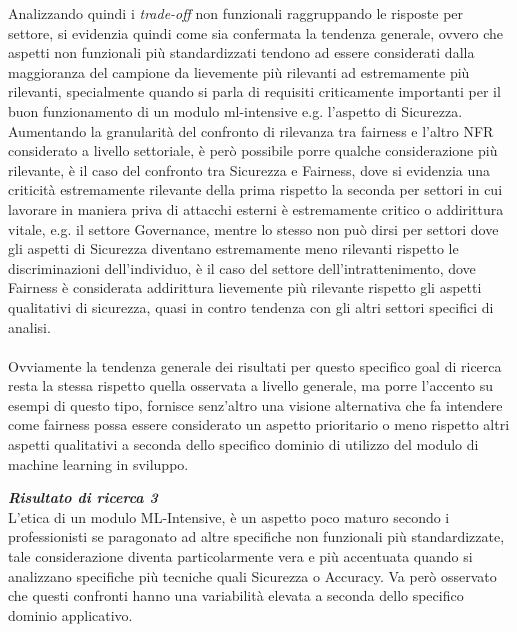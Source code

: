     Analizzando quindi i \emph{trade-off} non funzionali raggruppando le risposte per settore, si evidenzia quindi come sia confermata la tendenza generale, ovvero che aspetti non funzionali più standardizzati tendono ad essere considerati dalla maggioranza del campione da lievemente più rilevanti ad estremamente più rilevanti, specialmente quando si parla di requisiti criticamente importanti per il buon funzionamento di un modulo ml-intensive e.g. l'aspetto di Sicurezza. Aumentando la granularità del confronto di rilevanza tra fairness e l'altro NFR considerato a livello settoriale, è però possibile porre qualche considerazione più rilevante, è il caso del confronto tra Sicurezza e Fairness, dove si evidenzia una criticità estremamente rilevante della prima rispetto la seconda per settori in cui lavorare in maniera priva di attacchi esterni è estremamente critico o addirittura vitale, e.g. il settore Governance, mentre lo stesso non può dirsi per settori dove gli aspetti di Sicurezza diventano estremamente meno rilevanti rispetto le discriminazioni dell'individuo, è il caso del settore dell'intrattenimento, dove Fairness è considerata addirittura lievemente più rilevante rispetto gli aspetti qualitativi di sicurezza, quasi in contro tendenza con gli altri settori specifici di analisi. \\\\
    
    Ovviamente la tendenza generale dei risultati per questo specifico goal di ricerca resta la stessa rispetto quella osservata a livello generale, ma porre l'accento su esempi di questo tipo, fornisce senz'altro una visione alternativa che fa intendere come fairness possa essere considerato un aspetto prioritario o meno rispetto altri aspetti qualitativi a seconda dello specifico dominio di utilizzo del modulo di machine learning in sviluppo.
    
    \begin{center}
	
        \begin{tcolorbox}[width=\textwidth, colframe=black, colback=Gray]
    			\begin{minipage}{\textwidth}
    				\textit{\faKey  \textbf{ Risultato di ricerca 3}}\\
    			L'etica di un modulo ML-Intensive, è un aspetto poco maturo secondo i professionisti se paragonato ad altre specifiche non funzionali più standardizzate, tale considerazione diventa particolarmente vera e più accentuata quando si analizzano specifiche più tecniche quali Sicurezza o Accuracy. Va però osservato che questi confronti hanno una variabilità elevata a seconda dello specifico dominio applicativo.
    			\end{minipage}
		\end{tcolorbox}
	\end{center}
	
